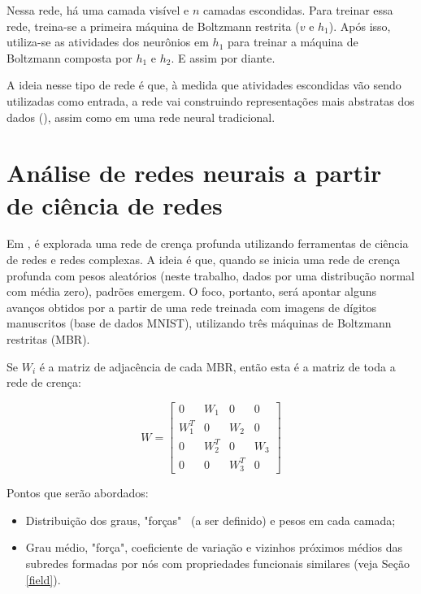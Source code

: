 \documentclass{article}
\begin{document}
            Nessa rede, há uma camada visível e $n$ camadas escondidas.
            Para treinar essa rede, treina-se a primeira máquina de Boltzmann restrita ($v$ e $h_1$).
            Após isso, utiliza-se as atividades dos neurônios em $h_1$ para treinar a máquina de Boltzmann composta por $h_1$ e $h_2$.
            E assim por diante.

            A ideia nesse tipo de rede é que, à medida que atividades escondidas vão sendo utilizadas como entrada, a rede vai construindo representações mais abstratas dos dados (\cite{testolin2018deep}), assim como em uma rede neural tradicional.

    \section{Análise de redes neurais a partir de ciência de redes}
        \label{analysis}

        Em \cite{testolin2018deep}, é explorada uma rede de crença profunda utilizando ferramentas de ciência de redes e redes complexas.
        A ideia é que, quando se inicia uma rede de crença profunda com pesos aleatórios (neste trabalho, dados por uma distribução normal com média zero), padrões emergem.
        O foco, portanto, será apontar alguns avanços obtidos por \cite{testolin2018deep} a partir de uma rede treinada com imagens de dígitos manuscritos (base de dados MNIST), utilizando três máquinas de Boltzmann restritas (MBR).
        
        Se $W_i$ é a matriz de adjacência de cada MBR, então esta é a matriz de toda a rede de crença:

        \begin{equation}
            W = \begin{bmatrix}
                    0 & W_1 & 0 & 0 \\
                    W_1^T & 0 & W_2 & 0 \\
                    0 & W_2^T & 0 & W_3 \\
                    0 & 0 & W_3^T & 0
                \end{bmatrix}
        \end{equation}

        Pontos que serão abordados:
        
        \begin{itemize}
            \item Distribuição dos graus, "forças" \ (a ser definido) e pesos em cada camada;
            \item Grau médio, "força", coeficiente de variação e vizinhos próximos médios das subredes formadas por nós com propriedades funcionais similares (veja Seção \ref{field}).
        \end{itemize}
\end{document}
